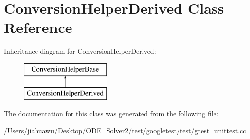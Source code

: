 \hypertarget{class_conversion_helper_derived}{}\section{Conversion\+Helper\+Derived Class Reference}
\label{class_conversion_helper_derived}
Inheritance diagram for Conversion\+Helper\+Derived\+:\begin{figure}[H]
\begin{center}
\leavevmode
\includegraphics[height=2.000000cm]{class_conversion_helper_derived}
\end{center}
\end{figure}


The documentation for this class was generated from the following file\+:\begin{DoxyCompactItemize}
\item 
/\+Users/jiahuawu/\+Desktop/\+O\+D\+E\+\_\+\+Solver2/test/googletest/test/gtest\+\_\+unittest.\+cc\end{DoxyCompactItemize}
